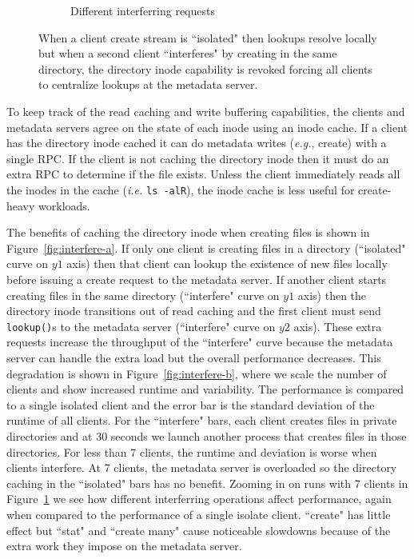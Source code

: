 \begin{figure}[t]
\begin{subfigure}[b]{.3\linewidth}
      \caption{Different interferring requests}
      \label{fig:interfere-c}
  \end{subfigure}
  \caption{When a client create stream is ``isolated" then lookups resolve
  locally but when a second client ``interferes" by creating in the same
  directory, the directory inode capability is revoked forcing all clients to
  centralize lookups at the metadata server.  
  \label{fig:interfere}}
\end{figure}

To keep track of the read caching and write buffering capabilities, the clients
and metadata servers agree on the state of each inode using an inode cache.  If
a client has the directory inode cached it can do metadata writes ({\it e.g.},
create) with a single RPC. If the client is not caching the directory inode
then it must do an extra RPC to determine if the file exists.  Unless the
client immediately reads all the inodes in the cache ({\it i.e.} \texttt{ls
-alR}), the inode cache is less useful for create-heavy workloads.

The benefits of caching the directory inode when creating files is shown in
Figure~\ref{fig:interfere-a}.  If only one client is creating files in a
directory (``isolated" curve on \(y1\) axis) then that client can lookup the
existence of new files locally before issuing a create request to the metadata
server. If another client starts creating files in the same directory
(``interfere" curve on \(y1\) axis) then the directory inode transitions out of
read caching and the first client must send \texttt{lookup()}s to the metadata
server (``interfere" curve on \(y2\) axis). These extra requests increase the
throughput of the ``interfere" curve because the metadata server can handle the
extra load but the overall performance decreases.  This degradation is shown in
Figure~\ref{fig:interfere-b}, where we scale the number of clients and show
increased runtime and variability. The performance is compared to a single
isolated client and the error bar is the standard deviation of the runtime of
all clients.  For the ``interfere" bars, each client creates files in private
directories and at 30 seconds we launch another process that creates files in
those directories.  For less than 7 clients, the runtime and deviation is worse
when clients interfere. At 7 clients, the metadata server is overloaded so the
directory caching in the ``isolated" bars has no benefit. Zooming in on runs
with 7 clients in Figure~\ref{fig:interfere-c} we see how different
interferring operations affect performance, again when compared to the
performance of a single isolate client.  ``create" has little effect but
``stat" and ``create many" cause noticeable slowdowns because of the extra work
they impose on the metadata server.\\

